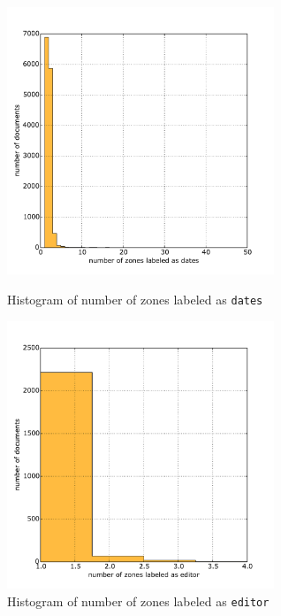 \begin{figure}
\centering
\begin{minipage}[t!]{0.48\linewidth}
  \includegraphics[width=8cm]{plots/dates_histogram}
  \caption{Histogram of number of zones labeled as \texttt{dates}}
  \label{fig:dates_histogram}
\end{minipage}
\quad
\begin{minipage}[t!]{0.48\linewidth}
  \includegraphics[width=8cm]{plots/editor_histogram}
  \caption{Histogram of number of zones labeled as \texttt{editor}}
  \label{fig:editor_histogram}
\end{minipage}
\end{figure}

